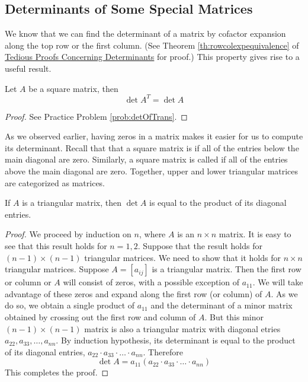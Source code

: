 \documentclass{ximera}
\begin{document}
\subsection*{Determinants of Some Special Matrices}
We know that we can find the determinant of a matrix by cofactor expansion along the top row or the first column.  (See Theorem \ref{th:rowcolexpequivalence} of \href{https://ximera.osu.edu/oerlinalg/LinearAlgebra/DET-0050/main}{Tedious Proofs Concerning Determinants} for proof.)  This property gives rise to a useful result.
\begin{theorem}\label{th:detoftrans}
Let $A$ be a square matrix, then
$$\det{A^T}=\det{A}$$
\end{theorem}
\begin{proof}
    See Practice Problem \ref{prob:detOfTrans}.
\end{proof}

As we observed earlier, having zeros in a matrix makes it easier for us to compute its determinant.  Recall that that a square matrix is  if all of the entries below the main diagonal are zero.  Similarly, a square matrix is called  if all of the entries above the main diagonal are zero.  Together, upper and lower triangular matrices are categorized as  matrices.

\begin{theorem}\label{lemma:triangulardet}
If $A$ is a triangular matrix, then $\det{A}$ is equal to the product of its diagonal entries.
\end{theorem}
\begin{proof}
We proceed by induction on $n$, where $A$ is an $n\times n$ matrix.  It is easy to see that this result holds for $n=1, 2$.  Suppose that the result holds for $(n-1)\times (n-1)$ triangular matrices.  We need to show that it holds for $n\times n$ triangular matrices.  Suppose $A=[a_{ij}]$ is a triangular matrix. 
 Then the first row or column or $A$ will consist of zeros, with a possible exception of $a_{11}$.  We will take advantage of these zeros and expand along the first row (or column) of $A$.  As we do so, we obtain a single product of $a_{11}$ and the determinant of a minor matrix obtained by crossing out the first row and column of $A$.  But this minor $(n-1)\times (n-1)$ matrix is also a triangular matrix with diagonal etries $a_{22}, a_{33},\ldots, a_{nn}$.  By induction hypothesis, its determinant is equal to the product of its diagonal entries, $a_{22}\cdot a_{33}\cdot\ldots\cdot a_{nn}$.  Therefore $$\det{A}=a_{11}(a_{22}\cdot a_{33}\cdot\ldots\cdot a_{nn})$$
 This completes the proof.
\end{proof}
\end{document}
